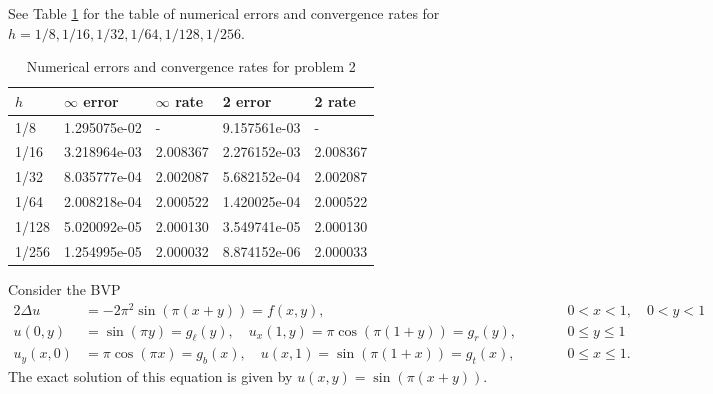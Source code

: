 \documentclass{homework}
\begin{document}
\begin{alphaparts}
		\questionpart See Table \ref{table:p2d} for the table of numerical errors and convergence rates for $h = 1/8, 1/16, 1/32, 1/64, 1/128, 1/256$.
		
		\begin{table}[h]
			\centering
			\begin{tabular}{@{}lllll@{}}
				\toprule
				$h$ & $\infty$ error & $\infty$ rate & 2 error & 2 rate \\
				\midrule
				1/8 & 	1.295075e-02&	-        &	9.157561e-03&	- \\
				1/16 & 	3.218964e-03&	2.008367&	2.276152e-03&	2.008367 \\
				1/32  &	8.035777e-04&	2.002087&	5.682152e-04&	2.002087 \\
				1/64  &	2.008218e-04&	2.000522&	1.420025e-04&	2.000522 \\
				1/128  &5.020092e-05&	2.000130&	3.549741e-05&	2.000130 \\
				1/256  &1.254995e-05&	2.000032&	8.874152e-06&	2.000033 \\
				\bottomrule
			\end{tabular}
			\caption{Numerical errors and convergence rates for problem 2}
			\label{table:p2d}
		\end{table}
	\end{alphaparts}
	
	\question Consider the BVP
	\begin{alignat*}{2}
		\Delta u &= -2\pi^2\sin(\pi(x+y)) = f(x,y), &\qquad &0<x<1, \quad 0<y<1 \\
		u(0,y) &= \sin(\pi y) = g_\ell(y), \quad u_x(1, y) = \pi\cos(\pi(1+y)) = g_r(y), & \qquad &0 \le y \le 1\\
		u_y(x,0) &= \pi\cos(\pi x) = g_b(x), \quad u(x, 1) = \sin(\pi(1+x)) = g_t(x), & \qquad &0 \le x \le 1. 
	\end{alignat*}
	The exact solution of this equation is given by $u(x,y) = \sin(\pi(x+y))$.
	
\end{document}
